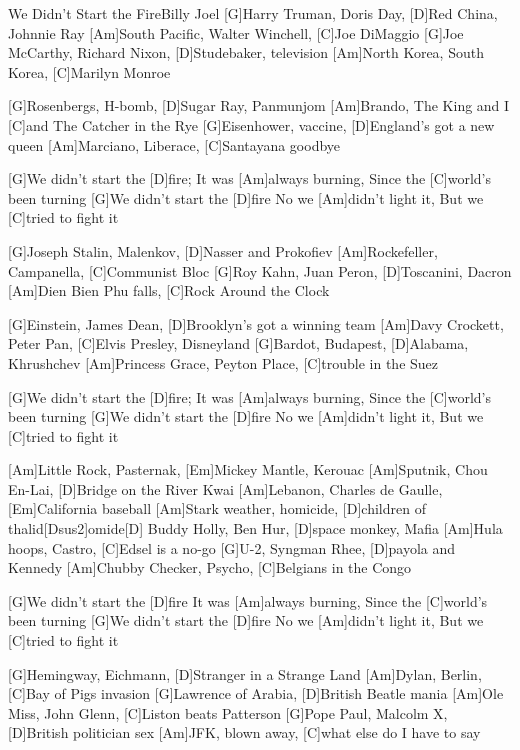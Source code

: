 \documentclass[../main.tex]{subfiles}
\begin{document}
\begin{song}{We Didn't Start the Fire}{Billy Joel}{}
[G]Harry Truman, Doris Day, [D]Red China, Johnnie Ray
[Am]South Pacific, Walter Winchell, [C]Joe DiMaggio
[G]Joe McCarthy, Richard Nixon, [D]Studebaker, television
[Am]North Korea, South Korea, [C]Marilyn Monroe

[G]Rosenbergs, H-bomb, [D]Sugar Ray, Panmunjom
[Am]Brando, The King and I [C]and The Catcher in the Rye
[G]Eisenhower, vaccine, [D]England's got a new queen
[Am]Marciano, Liberace, [C]Santayana goodbye

[G]We didn't start the [D]fire;
It was [Am]always burning,
Since the [C]world's been turning
[G]We didn't start the [D]fire
No we [Am]didn't light it,
But we [C]tried to fight it

[G]Joseph Stalin, Malenkov, [D]Nasser and Prokofiev
[Am]Rockefeller, Campanella, [C]Communist Bloc
[G]Roy Kahn, Juan Peron, [D]Toscanini, Dacron
[Am]Dien Bien Phu falls, [C]Rock Around the Clock

[G]Einstein, James Dean, [D]Brooklyn's got a winning team
[Am]Davy Crockett, Peter Pan, [C]Elvis Presley, Disneyland
[G]Bardot, Budapest, [D]Alabama, Khrushchev
[Am]Princess Grace, Peyton Place, [C]trouble in the Suez

[G]We didn't start the [D]fire;
It was [Am]always burning,
Since the [C]world's been turning
[G]We didn't start the [D]fire
No we [Am]didn't light it,
But we [C]tried to fight it

[Am]Little Rock, Pasternak, [Em]Mickey Mantle, Kerouac
[Am]Sputnik, Chou En-Lai, [D]Bridge on the River Kwai
[Am]Lebanon, Charles de Gaulle, [Em]California baseball
[Am]Stark weather, homicide, [D]children of thalid[Dsus2]omide[D]{\hh}
\pagebreak
[G]Buddy Holly, Ben Hur, [D]space monkey, Mafia
[Am]Hula hoops, Castro, [C]Edsel is a no-go
[G]U-2, Syngman Rhee, [D]payola and Kennedy
[Am]Chubby Checker, Psycho, [C]Belgians in the Congo

[G]We didn't start the [D]fire
It was [Am]always burning,
Since the [C]world's been turning
[G]We didn't start the [D]fire
No we [Am]didn't light it,
But we [C]tried to fight it

[G]Hemingway, Eichmann, [D]Stranger in a Strange Land
[Am]Dylan, Berlin, [C]Bay of Pigs invasion
[G]Lawrence of Arabia, [D]British Beatle mania
[Am]Ole Miss, John Glenn, [C]Liston beats Patterson
[G]Pope Paul, Malcolm X, [D]British politician sex
[Am]JFK, blown away, [C]what else do I have to say


\end{song}
\end{document}
